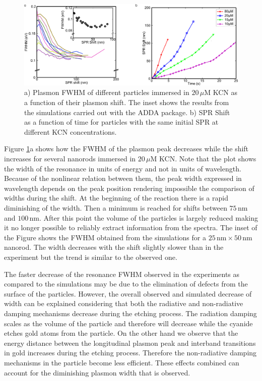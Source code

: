 \documentclass[a4paper,oneside,onecolumn]{article}
\newcommand{\nm}{\ensuremath{\,\textrm{nm}}}
\newcommand{\uM}{\ensuremath{\,\mu\textrm{M}}}
\begin{document}
\begin{figure}[p]
 \centering
 \includegraphics[width=0.95\linewidth]{Figures/03_Shifts/shifts.png}
 \caption{a) Plasmon FWHM of different particles immersed in $20\uM$
 KCN as a function of their plasmon shift. The inset shows the results from the
 simulations carried out with the ADDA package. b) SPR Shift as a function of
 time for particles with the same initial SPR at different KCN concentrations.}
 \label{fig:FWHM}
\end{figure}

Figure \ref{fig:FWHM}a shows how the FWHM of the plasmon peak decreases while the shift increases for several nanorods immersed in $20\uM$ KCN. Note that the plot shows the width of the resonance in units of energy and not in units of wavelength. Because of the nonlinear relation between them, the peak width expressed in wavelength depends on the peak position rendering impossible the comparison of widths during the shift. At the beginning of the reaction there is a rapid diminishing of the width. Then a minimum is reached for shifts between $75\nm$ and $100\nm$. After this point the volume of the particles is largely reduced making it no longer possible to reliably extract information from the spectra. The inset of the Figure shows the FWHM obtained from the simulations for a $25\nm\times50\nm$ nanorod. The width decreases with the shift slightly slower than in the experiment but the trend is similar to the observed one.

The faster decrease of the resonance FWHM observed in the experiments as
compared to the simulations may be due to the elimination of defects from the
surface of the particles. However, the overall observed and simulated decrease
of width can be explained considering that both the radiative and non-radiative
damping mechanisms decrease during the etching process. The radiation damping scales as the
volume of the particle\cite{Wokaun1982} and therefore will decrease while the
cyanide etches gold atoms from the particle.
On the other hand we observe that the energy distance between the longitudinal
plasmon peak and interband transitions in gold increases during the etching
process. Therefore the non-radiative damping mechanisms in the particle become
less efficient\cite{Sonnichsen2002}. These effects combined can account for the diminishing plasmon width that is observed.
\end{document}
